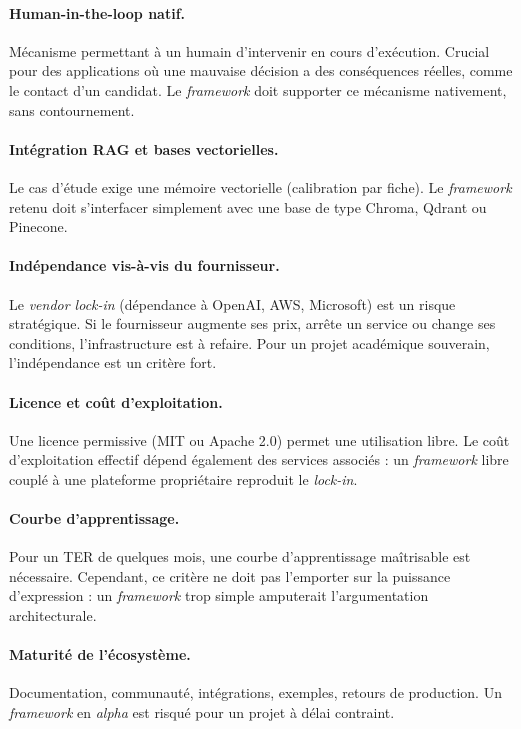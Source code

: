 \paragraph{Human-in-the-loop natif.}
Mécanisme permettant à un humain d'intervenir en cours d'exécution. Crucial pour des applications où une mauvaise décision a des conséquences réelles, comme le contact d'un candidat. Le \emph{framework} doit supporter ce mécanisme nativement, sans contournement.

\paragraph{Intégration RAG et bases vectorielles.}
Le cas d'étude exige une mémoire vectorielle (calibration par fiche). Le \emph{framework} retenu doit s'interfacer simplement avec une base de type Chroma, Qdrant ou Pinecone.

\paragraph{Indépendance vis-à-vis du fournisseur.}
Le \emph{vendor lock-in} (dépendance à OpenAI, AWS, Microsoft) est un risque stratégique. Si le fournisseur augmente ses prix, arrête un service ou change ses conditions, l'infrastructure est à refaire. Pour un projet académique souverain, l'indépendance est un critère fort.

\paragraph{Licence et coût d'exploitation.}
Une licence permissive (MIT ou Apache 2.0) permet une utilisation libre. Le coût d'exploitation effectif dépend également des services associés : un \emph{framework} libre couplé à une plateforme propriétaire reproduit le \emph{lock-in}.

\paragraph{Courbe d'apprentissage.}
Pour un TER de quelques mois, une courbe d'apprentissage maîtrisable est nécessaire. Cependant, ce critère ne doit pas l'emporter sur la puissance d'expression : un \emph{framework} trop simple amputerait l'argumentation architecturale.

\paragraph{Maturité de l'écosystème.}
Documentation, communauté, intégrations, exemples, retours de production. Un \emph{framework} en \emph{alpha} est risqué pour un projet à délai contraint.

